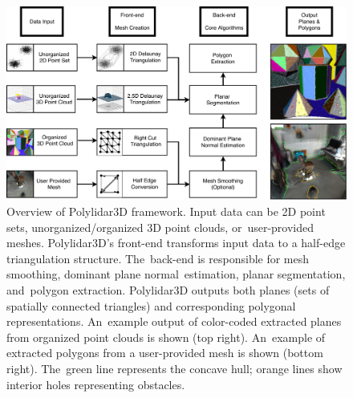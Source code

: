 \begin{figure}[t]
    \centering
    \includegraphics[width=0.95\linewidth]{chapter_3_polylidar3d/imgs/Polylidar3DArchitecture-SimplifedV4.pdf}
    \caption[Overview of Polylidar3D framework]{Overview of Polylidar3D framework. Input data can be 2D point sets, unorganized/organized 3D point clouds, or~user-provided meshes. Polylidar3D's front-end transforms input data to a half-edge triangulation structure. The~back-end is responsible for mesh smoothing, dominant plane normal~estimation, planar segmentation, and~polygon extraction. Polylidar3D outputs both planes (sets of spatially connected triangles) and corresponding polygonal representations. An~example output of color-coded extracted planes from organized point clouds is shown (top right). An~example of extracted polygons from a user-provided mesh is shown (bottom right). The~green line represents the concave hull; orange lines show interior holes representing obstacles.} %
    \label{fig:ch3_polylidar_overview}
\end{figure}

